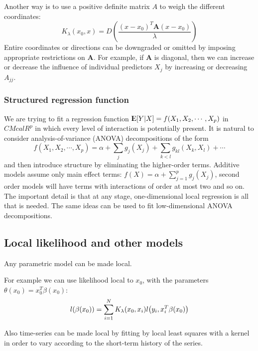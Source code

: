 \documentclass[12pt, letterpaper]{article}
\theoremstyle{definition}
\newcommand{\E}{{\rm I\kern-.3em E}}
\DeclarePairedDelimiter\autobracket{(}{)}
\newcommand{\br}[1]{\autobracket*{#1}}
\begin{document}
Another way is to use a positive definite matrix $A$ to weigh the different coordinates:
\begin{equation}
K_\lambda(x_0, x) = D\left( \frac{(x-x_0)^T\mathbf{A}(x-x_0)}{\lambda}\right)
\end{equation}
Entire coordinates or directions can be downgraded or omitted by imposing appropriate restrictions on $\mathbf{A}$. For example, if $\mathbf{A}$ is diagonal, then we can increase or decrease the influence of individual predictors $X_j$ by increasing or decreasing $A_{jj}$.

\subsubsection{Structured regression function}
We are trying to fit a regression function $\E[Y|X] =f(X_1,X_2, \cdots, X_p)$ in $CMcal{R}^p$ in which every level of interaction is potentially present. It is natural to consider analysis-of-variance (ANOVA) decompositions of the form
\begin{equation}
f(X_1,X_2,\cdots, X_p) = \alpha + \sum_j g_j(X_j) +  \sum_{k<l} g_{kl}(X_k, X_l) + \cdots 
\end{equation}
and then introduce structure by eliminating the higher-order terms. Additive models assume only main effect terms: $f(X) = \alpha + \sum_{j=1}^p g_j(X_j)$, second order models will have terms with interactions of order at most two and so on.  The important detail is that at any stage, one-dimensional local regression is all that is needed. The same ideas can be used to fit low-dimensional ANOVA decompositions.

\subsection{Local likelihood and other models}
Any parametric model can be made local.

For example we can use likelihood local to $x_0$,  with the parameters $\theta(x_0) = x_0^T\beta(x_0)$:
\begin{equation}
l\br{\beta(x_0)} = \sum_{i=1}^N K_\lambda (x_0,x_i) l\br{y_i, x_i^T\beta(x_0)}
\end{equation}

Also time-series can be made local by fitting by local least squares with a kernel in order to vary according to the short-term history of the series.
\end{document}
